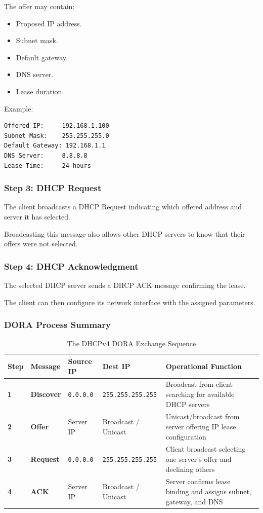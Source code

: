 The offer may contain:

\begin{itemize}
\item Proposed IP address.
\item Subnet mask.
\item Default gateway.
\item DNS server.
\item Lease duration.
\end{itemize}

Example:

\begin{lstlisting}
Offered IP:     192.168.1.100
Subnet Mask:    255.255.255.0
Default Gateway: 192.168.1.1
DNS Server:     8.8.8.8
Lease Time:     24 hours
\end{lstlisting}

\subsubsection{Step 3: DHCP Request}

The client broadcasts a DHCP Request indicating which offered address and server it has selected.

Broadcasting this message also allows other DHCP servers to know that their offers were not selected.

\subsubsection{Step 4: DHCP Acknowledgment}

The selected DHCP server sends a DHCP ACK message confirming the lease.

The client can then configure its network interface with the assigned parameters.

\subsubsection{DORA Process Summary}
\begin{table}[htbp]
\centering
\caption{The DHCPv4 DORA Exchange Sequence}
\label{tab:dhcp_dora_summary}
\begin{tabularx}{\textwidth}{p{1.2cm} p{2.4cm} p{1.8cm} p{1.8cm} X}
\toprule
\textbf{Step} & \textbf{Message} & \textbf{Source IP} & \textbf{Dest IP} & \textbf{Operational Function} \\
\midrule
\textbf{1} & \textbf{Discover} & \texttt{0.0.0.0} & \texttt{255.255.255.255} & Broadcast from client searching for available DHCP servers \\
\textbf{2} & \textbf{Offer} & Server IP & Broadcast / Unicast & Unicast/broadcast from server offering IP lease configuration \\
\textbf{3} & \textbf{Request} & \texttt{0.0.0.0} & \texttt{255.255.255.255} & Client broadcast selecting one server's offer and declining others \\
\textbf{4} & \textbf{ACK} & Server IP & Broadcast / Unicast & Server confirms lease binding and assigns subnet, gateway, and DNS \\
\bottomrule
\end{tabularx}
\end{table}


